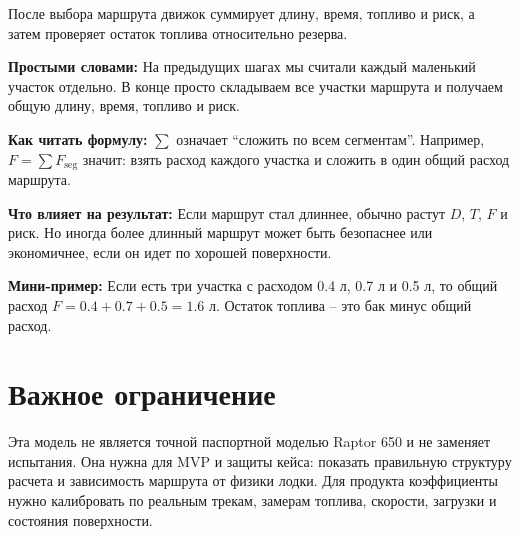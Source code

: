 \documentclass[12pt,a4paper]{article}
\newcommand{\simple}[1]{\par\smallskip\noindent\textbf{Простыми словами:} #1\par}
\newcommand{\howto}[1]{\par\smallskip\noindent\textbf{Как читать формулу:} #1\par}
\newcommand{\effect}[1]{\par\smallskip\noindent\textbf{Что влияет на результат:} #1\par}
\newcommand{\exampletext}[1]{\par\smallskip\noindent\textbf{Мини-пример:} #1\par}
\begin{document}
После выбора маршрута движок суммирует длину, время, топливо и риск,
а затем проверяет остаток топлива относительно резерва.

\simple{На предыдущих шагах мы считали каждый маленький участок отдельно. В
конце просто складываем все участки маршрута и получаем общую длину, время,
топливо и риск.}
\howto{\(\sum\) означает ``сложить по всем сегментам''. Например,
\(F=\sum F_{\mathrm{seg}}\) значит: взять расход каждого участка и сложить в
один общий расход маршрута.}
\effect{Если маршрут стал длиннее, обычно растут \(D\), \(T\), \(F\) и риск.
Но иногда более длинный маршрут может быть безопаснее или экономичнее, если он
идет по хорошей поверхности.}
\exampletext{Если есть три участка с расходом 0.4 л, 0.7 л и 0.5 л, то общий
расход \(F=0.4+0.7+0.5=1.6\) л. Остаток топлива -- это бак минус общий расход.}

\section{Важное ограничение}

Эта модель не является точной паспортной моделью Raptor 650 и не заменяет
испытания. Она нужна для MVP и защиты кейса: показать правильную структуру
расчета и зависимость маршрута от физики лодки. Для продукта коэффициенты нужно
калибровать по реальным трекам, замерам топлива, скорости, загрузки и состояния
поверхности.
\end{document}

